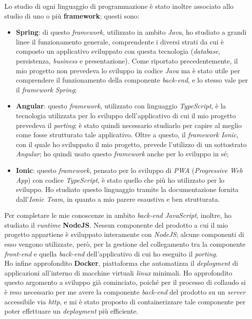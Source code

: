 Lo studio di ogni linguaggio di programmazione è stato inoltre associato allo studio di uno o più \textbf{framework}; questi sono:
\begin{itemize}
  \item \textbf{Spring}: di questo \textit{framework}, utilizzato in ambito \textit{Java}, ho studiato a grandi linee il funzionamento generale, comprendente i diversi strati da cui è composto un applicativo sviluppato con questa tecnologia (\textit{database}, persistenza, \textit{business} e presentazione). Come riportato precedentemente, il mio progetto non prevedeva lo sviluppo in codice \textit{Java} ma è stato utile per comprendere il funzionamento della componente \textit{back-end}, e lo stesso vale per il \textit{framework Spring};
  \item \textbf{Angular}: questo \textit{framework}, utilizzato con linguaggio \textit{TypeScript}, è la tecnologia utilizzata per lo sviluppo dell'applicativo di cui il mio progetto prevedeva il \textit{porting}; è stato quindi necessario studiarlo per capire al meglio come fosse strutturato tale applicativo. Oltre a questo, il \textit{framework Ionic}, con il quale ho sviluppato il mio progetto, prevede l'utilizzo di un sottostrato \textit{Angular}; ho quindi usato questo \textit{framework} anche per lo sviluppo in sé;
  \item \textbf{Ionic}: questo \textit{framework}, pensato per lo sviluppo di \textit{PWA} (\textit{Progressive Web App}) con codice \textit{TypeScript}, è stato quello che più ho utilizzato per lo sviluppo. Ho studiato questo linguaggio tramite la documentazione fornita dall'\textit{Ionic Team}, in quanto a mio parere esaustiva e ben strutturata.
\end{itemize}

Per completare le mie conoscenze in ambito \textit{back-end JavaScript}, inoltre, ho studiato il \textit{runtime} \textbf{NodeJS}. Nessun componente del prodotto a cui il mio progetto appartiene è sviluppato interamente con \textit{NodeJS}; alcune componenti di esso vengono utilizzate, però, per la gestione del collegamento tra la componente \textit{front-end} e quella \textit{back-end} dell'applicativo di cui ho eseguito il \textit{porting}. \\
Ho infine approfondito \textbf{Docker}, piattaforma che automatizza il \textit{deployment} di applicazioni all'interno di macchine virtuali \textit{linux} minimali. Ho approfondito questo argomento a sviluppo già cominciato, poiché per il processo di collaudo si è reso necessario per me avere la componente \textit{back-end} del prodotto su un \textit{server} accessibile via \textit{http}, e mi è stato proposto di containerizzare tale componente per poter effettuare un \textit{deployment} più efficiente.

